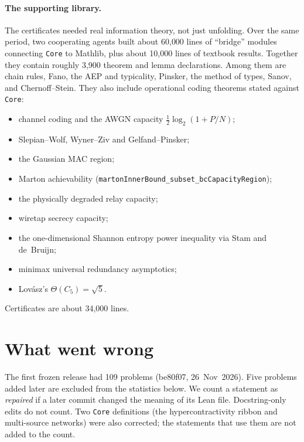 \documentclass[11pt]{article}
\newcommand{\code}[1]{\texttt{#1}}
\begin{document}
\paragraph{The supporting library.}
The certificates needed real information theory, not just unfolding. Over the same period,
two cooperating agents built about 60{,}000 lines of ``bridge'' modules connecting \code{Core}
to Mathlib, plus about 10{,}000 lines of textbook results. Together they contain roughly 3{,}900
theorem and lemma declarations. Among them are chain rules, Fano, the AEP and typicality, Pinsker,
the method of types, Sanov, and Chernoff--Stein. They also include operational coding theorems
stated against \code{Core}:
\begin{itemize}[leftmargin=*,itemsep=1pt]
\item channel coding and the AWGN capacity $\tfrac12\log_2(1+P/N)$;
\item Slepian--Wolf, Wyner--Ziv and Gelfand--Pinsker;
\item the Gaussian MAC region;
\item Marton achievability (\code{martonInnerBound\_subset\_bcCapacityRegion});
\item the physically degraded relay capacity;
\item wiretap secrecy capacity;
\item the one-dimensional Shannon entropy power inequality via Stam and de~Bruijn;
\item minimax universal redundancy asymptotics;
\item Lov\'asz's $\Theta(C_5)=\sqrt5$.
\end{itemize}
Certificates are about 34{,}000 lines.

\section{What went wrong}\label{sec:errors}

The first frozen release had 109 problems (be80f07, 26~Nov~2026). Five problems added later are
excluded from the statistics below. We count a statement as \emph{repaired} if a later commit
changed the meaning of its Lean file. Docstring-only edits do not count. Two \code{Core}
definitions (the hypercontractivity ribbon and multi-source networks) were also corrected; the
statements that use them are not added to the count.
\end{document}
